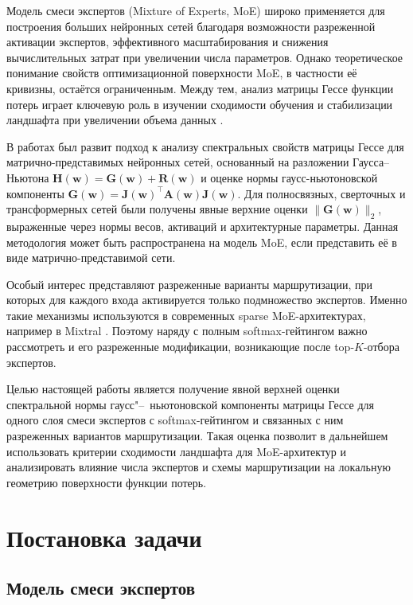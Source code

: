 \documentclass[11pt]{extarticle}
\theoremstyle{definition}
\theoremstyle{plain}
\theoremstyle{remark}
\begin{document}
Модель смеси экспертов (Mixture of Experts, MoE) \cite{Jacobs1991,Shazeer2017,Fedus2021} широко применяется для построения больших нейронных сетей благодаря возможности разреженной активации экспертов, эффективного масштабирования и снижения вычислительных затрат при увеличении числа параметров. Однако теоретическое понимание свойств оптимизационной поверхности MoE, в частности её кривизны, остаётся ограниченным. Между тем, анализ матрицы Гессе функции потерь играет ключевую роль в изучении сходимости обучения и стабилизации ландшафта при увеличении объема данных \cite{Papyan2019, Fort2019}.

В работах \cite{Kiselev2024, Meshkov2024} был развит подход к анализу спектральных свойств матрицы Гессе для матрично-представимых нейронных сетей, основанный на разложении Гаусса–Ньютона \(\mathbf{H}(\mathbf{w}) = \mathbf{G}(\mathbf{w}) + \mathbf{R}(\mathbf{w})\) и оценке нормы гаусс-ньютоновской компоненты \(\mathbf{G}(\mathbf{w}) = \mathbf{J}(\mathbf{w})^\top \mathbf{A}(\mathbf{w}) \mathbf{J}(\mathbf{w})\). Для полносвязных, сверточных и трансформерных сетей были получены явные верхние оценки \(\|\mathbf{G}(\mathbf{w})\|_2\), выраженные через нормы весов, активаций и архитектурные параметры. Данная методология может быть распространена на модель MoE, если представить её в виде матрично-представимой сети.

Особый интерес представляют разреженные варианты маршрутизации, при которых для каждого входа активируется только подмножество экспертов. Именно такие механизмы используются в современных sparse MoE-архитектурах, например в Mixtral \cite{Mixtral2024}. Поэтому наряду с полным softmax-гейтингом важно рассмотреть и его разреженные модификации, возникающие после top-$K$-отбора экспертов.

Целью настоящей работы является получение явной верхней оценки спектральной нормы гаусс"--~ньютоновской компоненты матрицы Гессе для одного слоя смеси экспертов с softmax-гейтингом и связанных с ним разреженных вариантов маршрутизации. Такая оценка позволит в дальнейшем использовать критерии сходимости ландшафта \cite{Kiselev2024} для MoE-архитектур и анализировать влияние числа экспертов и схемы маршрутизации на локальную геометрию поверхности функции потерь.

\section{Постановка задачи}

\subsection{Модель смеси экспертов}
\end{document}

